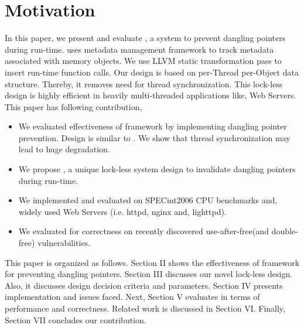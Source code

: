 \section{Motivation}
In this paper, we present and evaluate \projectname{}, a system to prevent dangling pointers during run-time. \projectname{} uses metadata management framework to track metadata associated with memory objects. We use LLVM static transformation pass to insert run-time function calls. Our design is based on per-Thread per-Object data structure. Thereby, it removes need for thread synchronization. This lock-less design is highly efficient in heavily multi-threaded applications like, Web Servers. \\
 
This paper has following contribution,
\begin{itemize}
\item We evaluated effectiveness of \metalloc{} framework by implementing dangling pointer prevention. Design is similar to \cite{FreeSentry}. We show that thread synchronization may lead to huge degradation.
\item We propose \projectname{}, a unique lock-less system design to invalidate dangling pointers during run-time.
\item We implemented and evaluated \projectname{} on SPECint2006 CPU benchmarks and, widely used Web Servers (i.e. httpd, nginx and, lighttpd).
\item We evaluated \projectname{} for correctness on recently discovered use-after-free(and double-free) vulnerabilities.
\end{itemize}

This paper is organized as follows. Section II shows the effectiveness of \metalloc{} framework for preventing dangling pointers. Section III discusses our novel lock-less \projectname{} design. Also, it discusses design decision criteria and parameters. Section IV presents \projectname{} implementation and issues faced. Next, Section V evaluates \projectname{} in terms of performance and correctness. Related work is discussed in Section VI. Finally, Section VII concludes our contribution.


